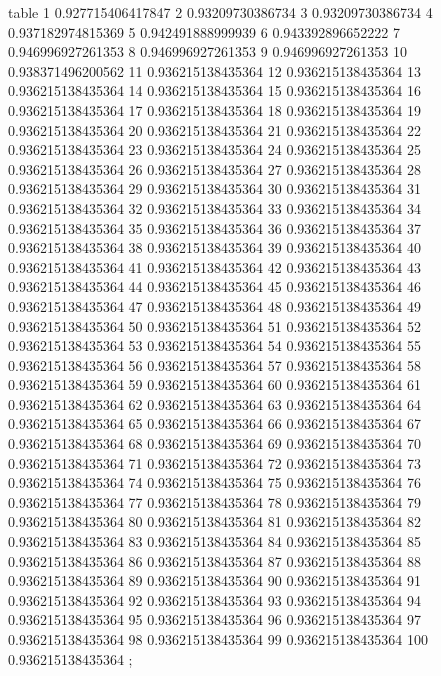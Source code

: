 table {%
	1 0.927715406417847
	2 0.93209730386734
	3 0.93209730386734
	4 0.937182974815369
	5 0.942491888999939
	6 0.943392896652222
	7 0.946996927261353
	8 0.946996927261353
	9 0.946996927261353
	10 0.938371496200562
	11 0.936215138435364
	12 0.936215138435364
	13 0.936215138435364
	14 0.936215138435364
	15 0.936215138435364
	16 0.936215138435364
	17 0.936215138435364
	18 0.936215138435364
	19 0.936215138435364
	20 0.936215138435364
	21 0.936215138435364
	22 0.936215138435364
	23 0.936215138435364
	24 0.936215138435364
	25 0.936215138435364
	26 0.936215138435364
	27 0.936215138435364
	28 0.936215138435364
	29 0.936215138435364
	30 0.936215138435364
	31 0.936215138435364
	32 0.936215138435364
	33 0.936215138435364
	34 0.936215138435364
	35 0.936215138435364
	36 0.936215138435364
	37 0.936215138435364
	38 0.936215138435364
	39 0.936215138435364
	40 0.936215138435364
	41 0.936215138435364
	42 0.936215138435364
	43 0.936215138435364
	44 0.936215138435364
	45 0.936215138435364
	46 0.936215138435364
	47 0.936215138435364
	48 0.936215138435364
	49 0.936215138435364
	50 0.936215138435364
	51 0.936215138435364
	52 0.936215138435364
	53 0.936215138435364
	54 0.936215138435364
	55 0.936215138435364
	56 0.936215138435364
	57 0.936215138435364
	58 0.936215138435364
	59 0.936215138435364
	60 0.936215138435364
	61 0.936215138435364
	62 0.936215138435364
	63 0.936215138435364
	64 0.936215138435364
	65 0.936215138435364
	66 0.936215138435364
	67 0.936215138435364
	68 0.936215138435364
	69 0.936215138435364
	70 0.936215138435364
	71 0.936215138435364
	72 0.936215138435364
	73 0.936215138435364
	74 0.936215138435364
	75 0.936215138435364
	76 0.936215138435364
	77 0.936215138435364
	78 0.936215138435364
	79 0.936215138435364
	80 0.936215138435364
	81 0.936215138435364
	82 0.936215138435364
	83 0.936215138435364
	84 0.936215138435364
	85 0.936215138435364
	86 0.936215138435364
	87 0.936215138435364
	88 0.936215138435364
	89 0.936215138435364
	90 0.936215138435364
	91 0.936215138435364
	92 0.936215138435364
	93 0.936215138435364
	94 0.936215138435364
	95 0.936215138435364
	96 0.936215138435364
	97 0.936215138435364
	98 0.936215138435364
	99 0.936215138435364
	100 0.936215138435364
};
